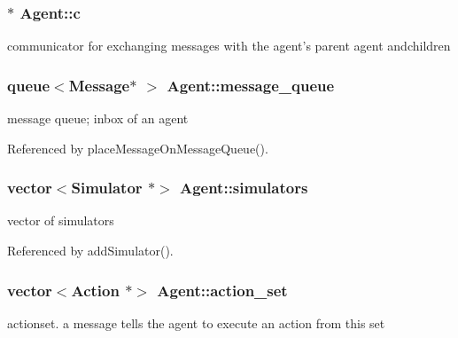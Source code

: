 \subsubsection[c]{$\ast$ {\bf Agent::c}\hspace{0.3cm}{\tt  [protected]}}\label{classAgent_e479fdfb645e761d5ec172c3e238cba7}


communicator for exchanging messages with the agent's parent agent andchildren 

\subsubsection[message\_\-queue]{\setlength{\rightskip}{0pt plus 5cm}queue$<${\bf Message}$\ast$ $>$ {\bf Agent::message\_\-queue}\hspace{0.3cm}{\tt  [protected]}}\label{classAgent_c8a5a105e4947f57ba1d417bbcad22d8}


message queue; inbox of an agent 



Referenced by placeMessageOnMessageQueue().
\subsubsection[simulators]{\setlength{\rightskip}{0pt plus 5cm}vector$<${\bf Simulator} $\ast$$>$ {\bf Agent::simulators}\hspace{0.3cm}{\tt  [protected]}}\label{classAgent_c6609e8931a1c6a955ac43a433712ebf}


vector of simulators 



Referenced by addSimulator().
\subsubsection[action\_\-set]{\setlength{\rightskip}{0pt plus 5cm}vector$<${\bf Action} $\ast$$>$ {\bf Agent::action\_\-set}\hspace{0.3cm}{\tt  [protected]}}\label{classAgent_7bfcffa54507eb1b7798a727253ba5da}


actionset. a message tells the agent to execute an action from this set 



